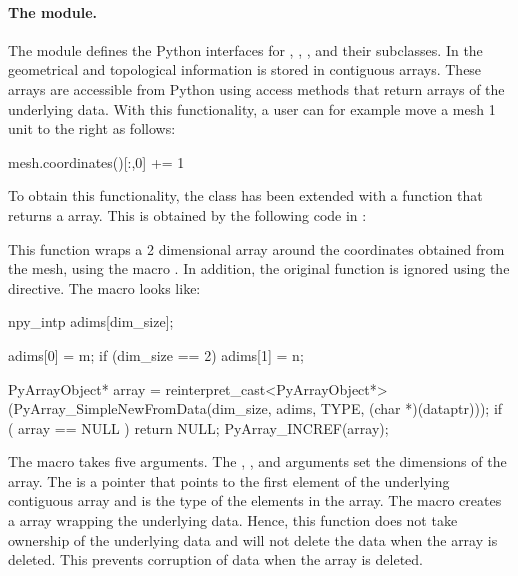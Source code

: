 \paragraph{The  module.}
The  module defines the Python interfaces for ,
, , and their subclasses. 
In  the geometrical and topological information is stored in
contiguous arrays. These arrays are accessible from Python using access
methods that return \numpy arrays of the underlying data. With this
functionality, a user can for
example move a mesh 1 unit to the right as follows:
\begin{python}
mesh.coordinates()[:,0] += 1
\end{python}
To obtain this functionality, the  class has been extended  
with a function  that
returns a \numpy array. This is obtained by the following code in :
This function wraps a 2 dimensional \numpy array around 
the coordinates obtained from the mesh, using the macro 
. In addition, the original   function
is ignored using the  directive. The
 macro looks like:
\begin{c++}
  npy_intp adims[dim_size];

  adims[0] = m;
  if (dim_size == 2)
    adims[1] = n;

  PyArrayObject* array = reinterpret_cast<PyArrayObject*>(PyArray_SimpleNewFromData(dim_size, adims, TYPE, (char *)(dataptr)));
  if ( array == NULL ) return NULL;
  PyArray_INCREF(array);
\end{c++}
The macro takes five arguments. The , , and 
arguments set the dimensions of the \numpy array. The  is a
pointer that points to the first element of the underlying contiguous array
and  is the type of the elements in the array. The \numpy macro
 creates a \numpy array wrapping
the underlying data. Hence, this function 
does not take ownership of the underlying data and  
will not delete the data when the \numpy array is deleted. 
This prevents corruption of data when the \numpy array is deleted. 

